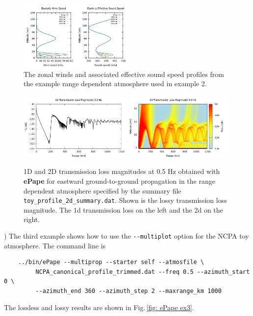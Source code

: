 \begin{figure}[h]
\begin{center}
\includegraphics[width=0.5\textwidth]{figs/ePape_ex2_profiles.png}
\end{center}
\caption{The zonal winds and associated effective sound speed profiles from the example range dependent atmosphere used in example 2.}
\label{fig: ePape ex2 profiles}
\end{figure}


\begin{figure}[h]
\begin{center}
\includegraphics[width=0.49\textwidth]{figs/ePape_ex2_1d}
\includegraphics[width=0.49\textwidth]{figs/ePape_ex2_2d}
\end{center}
\caption{1D and 2D transmission loss magnitudes at 0.5 Hz obtained with {\bf ePape} for eastward ground-to-ground propagation in the range dependent atmosphere specified by the summary file {\tt toy\_profile\_2d\_summary.dat}. Shown is the lossy transmission loss magnitude. The 1d transmission loss on the left and the 2d on the right.}
\label{fig: ePape ex2}
\end{figure}

) The third example shows how to use the \verb+--multiplot+ option for the NCPA toy atmosphere. The command line is
\begin{verbatim}
    ../bin/ePape --multiprop --starter self --atmosfile \
         NCPA_canonical_profile_trimmed.dat --freq 0.5 --azimuth_start 0 \
         --azimuth_end 360 --azimuth_step 2 --maxrange_km 1000
\end{verbatim}
The lossless and lossy results are shown in Fig.\,\ref{fig: ePape ex3}. 
         
